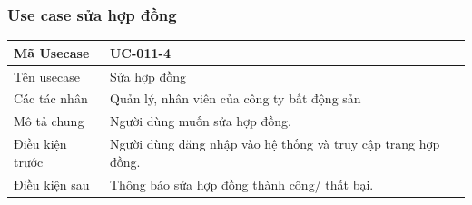 \documentclass[12pt,a4paper]{article}
\begin{document}
    \subsubsection*{Use case sửa hợp đồng }
    \begin{table}[H]
        \centering
        \begin{tabular}{|p{3.5cm}|p{11.5cm}|c|}
            \hline
            Mã Usecase      & UC-011-4                                                      \\
            \hline
            Tên usecase     & Sửa hợp đồng                                                  \\
            \hline
            Các tác nhân    & Quản lý, nhân viên của công ty bất động sản                   \\
            \hline
            Mô tả chung     & Người dùng muốn sửa hợp đồng.                                 \\
            \hline

            Điều kiện trước & Người dùng đăng nhập vào hệ thống và truy cập trang hợp đồng. \\
            \hline

            Điều kiện sau   & Thông báo sửa hợp đồng thành công/ thất bại.                  \\
            \hline


\end{tabular}
\end{table}
\end{document}
